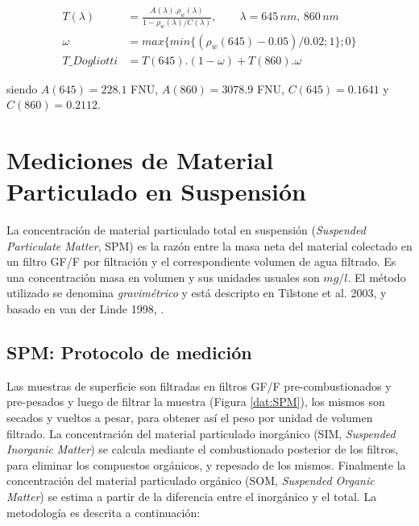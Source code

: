         \begin{equation}
        \begin{aligned}
            T(\lambda) & = \frac{A(\lambda).\rho_{w}(\lambda)}{1-\rho_{w}(\lambda)/C(\lambda)}, \quad\quad \lambda = 645\,nm,\,860\,nm\\
            \omega & = max\{min\{(\rho_{w}(645)-0.05)/0.02;1\};0\}\\
            T\_Dogliotti & = T(645).(1-\omega) + T(860).\omega
        \end{aligned}
        \label{dat:eq:dogliotti2015}
        \end{equation}

        \noindent siendo $A(645) = 228.1$ FNU, $A(860) = 3078.9$ FNU, $C(645) = 0.1641$ y $C(860) = 0.2112$.

\section{Mediciones de Material Particulado en Suspensión}
\label{dat:s:spm}

    La concentración de material particulado total en suspensión (\textit{Suspended Particulate Matter}, SPM) es la razón entre la masa neta del material colectado en un filtro GF/F por filtración y el correspondiente volumen de agua filtrado. Es una concentración masa en volumen y sus unidades usuales son $mg/l$. El método utilizado se denomina \textit{gravimétrico} y está descripto en Tilstone et al. 2003, \cite{tilstone2003} y basado en van der Linde 1998, \cite{vanderlinde1998}.
    
    \subsection{SPM: Protocolo de medición}
    \label{dat:s:spmMed}

        Las muestras de superficie son filtradas en filtros GF/F pre-combustionados y pre-pesados y luego de filtrar la muestra (Figura \ref{dat:SPM}), los mismos son secados y vueltos a pesar, para obtener así el peso por unidad de volumen filtrado. La concentración del material particulado inorgánico (SIM, \textit{Suspended Inorganic Matter}) se calcula mediante el combustionado posterior de los filtros, para eliminar los compuestos orgánicos, y repesado de los mismos. Finalmente la concentración del material particulado orgánico (SOM, \textit{Suspended Organic Matter}) se estima a partir de la diferencia entre el inorgánico y el total. La metodología es descrita a continuación:
        
